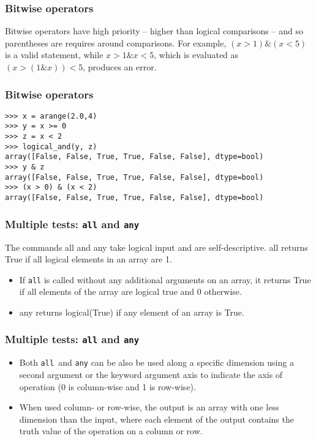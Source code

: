 \documentclass[KSmainSlides.tex]{subfiles}
\begin{document}
\begin{frame}[fragile]
\frametitle{Bitwise operators}
Bitwise operators have high priority – higher than logical comparisons – and so parentheses are requires around
comparisons. 
For example, $(x>1) \& (x<5)$ is a valid statement, while $x>1 \& x<5$, which is evaluated as
$(x>(1 \& x))<5$, produces an error.
\end{frame}
\begin{frame}[fragile]
\frametitle{Bitwise operators}
\begin{framed}
\begin{verbatim}
>>> x = arange(2.0,4)
>>> y = x >= 0
>>> z = x < 2
>>> logical_and(y, z)
array([False, False, True, True, False, False], dtype=bool)
>>> y & z
array([False, False, True, True, False, False], dtype=bool)
>>> (x > 0) & (x < 2)
array([False, False, True, True, False, False], dtype=bool)
\end{verbatim}
\end{framed}
\end{frame}
\begin{frame}[fragile]
	\frametitle{Multiple tests: \texttt{all} and \texttt{any}}
The commands all and any take logical input and are self-descriptive. all returns True if all logical elements
in an array are 1.
\begin{itemize}
\item  If \texttt{all} is called without any additional arguments on an array, it returns True if all
elements of the array are logical true and 0 otherwise. 
\item 
any returns logical(True) if any element of an array is True.
\end{itemize}
\end{frame}
\begin{frame}[fragile]
	\frametitle{Multiple tests: \texttt{all} and \texttt{any}}
\begin{itemize}
\item Both \texttt{all }and \texttt{any} can be also be used along a specific dimension using a second argument or the
keyword argument axis to indicate the axis of operation (0 is column-wise and 1 is row-wise). 

\item When used column- or row-wise, the output is an array with one less dimension than the input, where each element
of the output contains the truth value of the operation on a column or row.
\end{itemize}

\end{frame}
\end{document}
